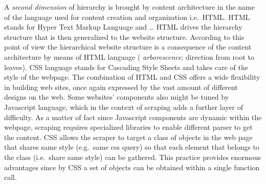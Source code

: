 \documentclass[
  12pt,
  a4paper,
  oneside]{book}
\theoremstyle{definition}
\theoremstyle{definition}
\theoremstyle{definition}
\theoremstyle{remark}
\begin{document}
A \emph{second dimension} of hierarchy is brought by content architecture in the name of the language used for content creation and organization i.e.~HTML. HTML stands for Hyper Text Markup Language and \ldots{}
HTML drives the hierarchy structure that is then generalized to the website structure. According to this point of view the hierarchical website structure is a consequence of the content architecture by means of HTML language ( \emph{arborescence}: direction from root to leaves).
CSS language stands for Cascading Style Sheets and takes care of the style of the webpage. The combination of HTML and CSS offers a wide flexibility in building web sites, once again expressed by the vast amount of different designs on the web. Some websites' components also might be tuned by Javascript language, which in the context of scraping adds a further layer of difficulty. As a matter of fact since Javascript components are dynamic within the webpage, scraping requires specialized libraries to enable different parser to get the content. CSS allows the scraper to target a class of objects in the web page that shares same style (e.g.~same css query) so that each element that belongs to the class (i.e.~share same style) can be gathered. This practice provides enormous advantages since by CSS a set of objects can be obtained within a single function call.
\end{document}
